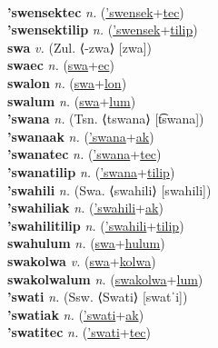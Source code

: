  \label{'swensekak} \\
\textbf{'swensektec} \textit{n.} (\hyperref['swensek]{'swensek}+\hyperref[tec]{tec})
 \label{'swensektec} \\
\textbf{'swensektilip} \textit{n.} (\hyperref['swensek]{'swensek}+\hyperref[tilip]{tilip})
 \label{'swensektilip} \\
\textbf{swa} \textit{v.} (Zul. ⟨-zwa⟩ [zwa])
 \label{swa} \\
\textbf{swaec} \textit{n.} (\hyperref[swa]{swa}+\hyperref[ec]{ec})
 \label{swaec} \\
\textbf{swalon} \textit{n.} (\hyperref[swa]{swa}+\hyperref[lon]{lon})
 \label{swalon} \\
\textbf{swalum} \textit{n.} (\hyperref[swa]{swa}+\hyperref[lum]{lum})
 \label{swalum} \\
\textbf{'swana} \textit{n.} (Tsn. ⟨tswana⟩ [t͡swana])
 \label{'swana} \\
\textbf{'swanaak} \textit{n.} (\hyperref['swana]{'swana}+\hyperref[ak]{ak})
 \label{'swanaak} \\
\textbf{'swanatec} \textit{n.} (\hyperref['swana]{'swana}+\hyperref[tec]{tec})
 \label{'swanatec} \\
\textbf{'swanatilip} \textit{n.} (\hyperref['swana]{'swana}+\hyperref[tilip]{tilip})
 \label{'swanatilip} \\
\textbf{'swahili} \textit{n.} (Swa. ⟨swahili⟩ [swahili])
 \label{'swahili} \\
\textbf{'swahiliak} \textit{n.} (\hyperref['swahili]{'swahili}+\hyperref[ak]{ak})
 \label{'swahiliak} \\
\textbf{'swahilitilip} \textit{n.} (\hyperref['swahili]{'swahili}+\hyperref[tilip]{tilip})
 \label{'swahilitilip} \\
\textbf{swahulum} \textit{n.} (\hyperref[swa]{swa}+\hyperref[hulum]{hulum})
 \label{swahulum} \\
\textbf{swakolwa} \textit{v.} (\hyperref[swa]{swa}+\hyperref[kolwa]{kolwa})
 \label{swakolwa} \\
\textbf{swakolwalum} \textit{n.} (\hyperref[swakolwa]{swakolwa}+\hyperref[lum]{lum})
 \label{swakolwalum} \\
\textbf{'swati} \textit{n.} (Ssw. ⟨Swati⟩ [swatˈi])
 \label{'swati} \\
\textbf{'swatiak} \textit{n.} (\hyperref['swati]{'swati}+\hyperref[ak]{ak})
 \label{'swatiak} \\
\textbf{'swatitec} \textit{n.} (\hyperref['swati]{'swati}+\hyperref[tec]{tec})
 \label{'swatitec} \\

